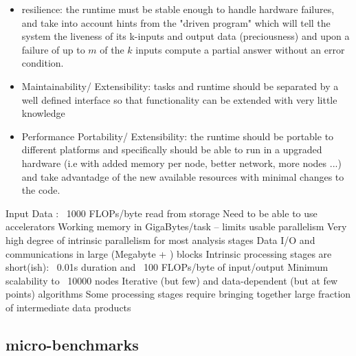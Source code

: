 \begin{itemize}
\item resilience: the runtime must be stable enough to handle hardware failures, and take into account hints from the "driven program" which will tell the system the liveness of its k-inputs and output data (preciousness) and upon a failure of up to $m$ of the $k$ inputs compute a partial answer without an error condition.
\item Maintainability/ Extensibility: tasks and runtime should be separated by a well defined interface so that functionality can be extended with very little knowledge 
\item Performance Portability/ Extensibility: the runtime should be portable to different platforms and specifically should be able to run in a upgraded hardware (i.e with added memory per node, better network, more nodes ...) and take advantadge of the new available resources with minimal changes to the code.
\end{itemize}

Input Data : ~1000 FLOPs/byte read from storage
Need to be able to use accelerators
Working memory in GigaBytes/task – limits usable parallelism
Very high degree of intrinsic parallelism for most analysis stages
Data I/O and communications in large (Megabyte + ) blocks
Intrinsic processing stages are short(ish): ~0.01s duration and ~100 FLOPs/byte of input/output
Minimum scalability to ~10000 nodes
Iterative (but few) and data-dependent (but at few points) algorithms
Some processing stages require bringing together large fraction of intermediate data products

\subsection{micro-benchmarks}

